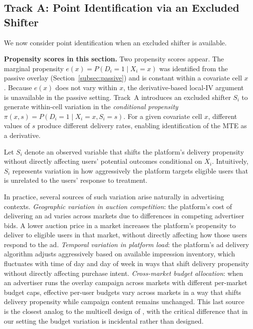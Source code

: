 \documentclass[11pt]{article}
\begin{document}
\subsection{Track A: Point Identification via an Excluded Shifter}
\label{subsec:pointid}

We now consider point identification when an excluded shifter is available.

\textbf{Propensity scores in this section.}  Two propensity scores appear.  The
marginal propensity $e(x) = P(D_i=1 \mid X_i=x)$ was identified from the
passive overlay (Section~\ref{subsec:passive}) and is constant within a
covariate cell $x$.  Because $e(x)$ does not vary within $x$, the
derivative-based local-IV argument is unavailable in the passive setting.
Track~A introduces an excluded shifter $S_i$ to generate within-cell variation
in the \emph{conditional propensity} $\pi(x,s) = P(D_i=1 \mid X_i=x, S_i=s)$.
For a given covariate cell $x$, different values of $s$ produce different
delivery rates, enabling identification of the MTE as a derivative.

Let $S_i$ denote an observed variable that shifts the platform's delivery
propensity without directly affecting users' potential outcomes conditional on
$X_i$.  Intuitively, $S_i$ represents variation in how aggressively the
platform targets eligible users that is unrelated to the users' response to
treatment.

In practice, several sources of such variation arise naturally in advertising
contexts.  \emph{Geographic variation in auction competition}: the platform's
cost of delivering an ad varies across markets due to differences in competing
advertiser bids.  A lower auction price in a market increases the platform's
propensity to deliver to eligible users in that market, without directly
affecting how those users respond to the ad.  \emph{Temporal variation in
platform load}: the platform's ad delivery algorithm adjusts aggressively based
on available impression inventory, which fluctuates with time of day and day of
week in ways that shift delivery propensity without directly affecting purchase
intent.  \emph{Cross-market budget allocation}: when an advertiser runs the
overlay campaign across markets with different per-market budget caps, effective
per-user budgets vary across markets in a way that shifts delivery propensity
while campaign content remains unchanged.  This last source is the closest
analog to the multicell design of \citet{waisman2025multicell}, with the
critical difference that in our setting the budget variation is incidental rather
than designed.
\end{document}
